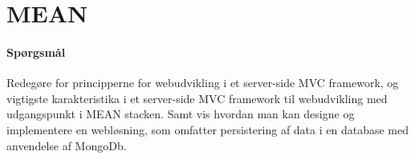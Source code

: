 \section{MEAN}

\paragraph{Spørgsmål}
Redegøre for principperne for webudvikling i et server-side MVC framework, og vigtigste karakteristika i et server-side	MVC framework til webudvikling med udgangspunkt i MEAN stacken.	Samt vis hvordan man kan designe og implementere en	webløsning, som omfatter persistering af data i en database	med anvendelse af MongoDb.
